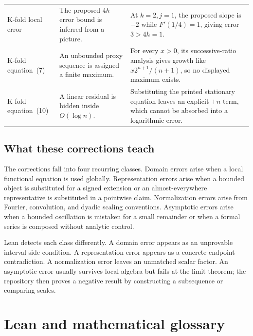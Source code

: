 \documentclass[11pt,oneside]{article}
\theoremstyle{definition}
\theoremstyle{remark}
\begin{document}
\begin{longtable}{@{}>{\raggedright\arraybackslash}p{} >{\raggedright\arraybackslash}p{} >{\raggedright\arraybackslash}p{}@{}}
K-fold local error & The proposed \(4h\) error bound is inferred from a picture. & At \(k=2,j=1\), the proposed slope is \(-2\) while \(F'(1/4)=1\), giving error \(3>4h=1\). \\
K-fold equation~(7) & An unbounded proxy sequence is assigned a finite maximum. & For every \(x>0\), its successive-ratio analysis gives growth like \(x2^{n+1}/(n+1)\), so no displayed maximum exists. \\
K-fold equation~(10) & A linear residual is hidden inside \(O(\log n)\). & Substituting the printed stationary equation leaves an explicit \(+n\) term, which cannot be absorbed into a logarithmic error. \\
\bottomrule
\end{longtable}

\subsection{What these corrections teach}
The corrections fall into four recurring classes.  Domain errors arise when a local functional equation is used globally.  Representation errors arise when a bounded object is substituted for a signed extension or an almost-everywhere representative is substituted in a pointwise claim.  Normalization errors arise from Fourier, convolution, and dyadic scaling conventions.  Asymptotic errors arise when a bounded oscillation is mistaken for a small remainder or when a formal series is composed without analytic control.

Lean detects each class differently.  A domain error appears as an unprovable interval side condition.  A representation error appears as a concrete endpoint contradiction.  A normalization error leaves an unmatched scalar factor.  An asymptotic error usually survives local algebra but fails at the limit theorem; the repository then proves a negative result by constructing a subsequence or comparing scales.

\section{Lean and mathematical glossary}\label{app:glossary}
\end{document}
